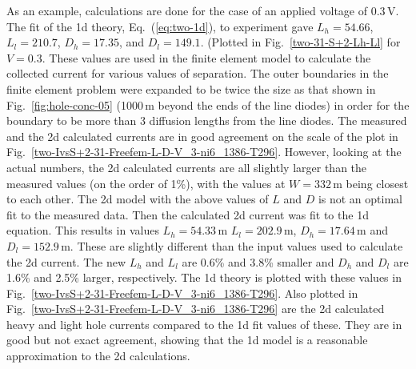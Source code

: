 As an example, calculations are done for the case of an applied
voltage of 0.3\,V. 
 The fit of the 1d theory, Eq.~(\ref{eq:two-1d}), to experiment gave $L_h=54.66$,
$L_l=210.7$, $D_h=17.35$, and $D_l=149.1$.
 (Plotted in Fig.~\ref{two-31-S+2-Lh-Ll} for $V=0.3$.
These values are used in the finite element model to calculate
the collected current for various values of separation.
The outer boundaries in the finite element problem were expanded
 to be twice the size as that shown in Fig.~\ref{fig:hole-conc-05}
(1000\,\textmu m beyond the ends of the line diodes) in
order for the boundary to be more than 3 diffusion lengths from the
line diodes.
The measured and the 2d calculated currents are in good agreement on
the scale of the plot in
Fig.~\ref{two-IvsS+2-31-Freefem-L-D-V_3-ni6_1386-T296}.
  However, looking at the actual numbers, the 2d calculated
 currents are all slightly larger
 than the measured values (on the order of 1\%), with the values at
 $W=332$\,\textmu m being
 closest to each other.  The 2d model with the above values of $L$ and
$D$ is not an optimal fit to the measured data.
Then the calculated 2d current was fit to the 1d equation.
This results in values  $L_h=54.33$\,\textmu m $L_l=202.9$\,\textmu m,
 $D_h=17.64$\,\textmu m and $D_l=152.9$\,\textmu m.
These are slightly different than the input values 
 used to calculate the 2d current.
The new $L_h$ and $L_l$ are 0.6\% and 3.8\% smaller and  $D_h$ and $D_l$ are
1.6\% and 2.5\% larger, respectively.
The 1d theory is plotted with these values in
 Fig.~\ref{two-IvsS+2-31-Freefem-L-D-V_3-ni6_1386-T296}.
%
Also plotted in Fig.~\ref{two-IvsS+2-31-Freefem-L-D-V_3-ni6_1386-T296}
 are the 2d calculated heavy and
light hole currents compared to the 1d fit values of these.
They are in good but not exact agreement, showing that the 1d model 
is a reasonable approximation to the 2d calculations.

